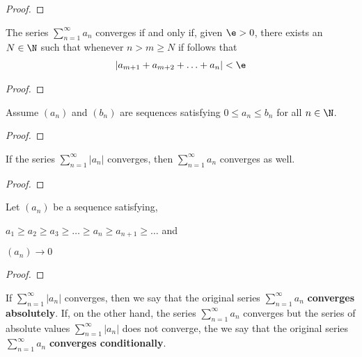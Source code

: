 \begin{proof}
\end{proof}

\begin{theorem}
	The series $\sum_{n=1}^{\infty} a_n$ converges if and only if, given $\e > 0$, there exists an $N \in \N$ such that whenever $n > m \ge N$ if follows that
	\begin{align}
		\left|a_{m+1} + a_{m+2} + \ldots + a_n\right| < \e
	\end{align}
\end{theorem}

\begin{proof}
	
\end{proof}

\begin{theorem}
	Assume $\left( a_n \right) $ and $\left( b_n \right) $ are sequences satisfying $0 \le a_n \le  b_n$ for all $n \in \N$.
\end{theorem}

\begin{proof}
	
\end{proof}

\begin{theorem}
	If the series $\sum_{n=1}^{\infty} \left|a_n\right|$ converges, then $\sum_{n=1}^{\infty} a_n$ converges as well. 
\end{theorem}

\begin{proof}
	
\end{proof}

\begin{theorem}
	Let $\left( a_n \right) $ be a sequence satisfying,
	\begin{romanize}
		\item $a_1 \ge a_2 \ge a_3 \ge  \ldots \ge  a_n \ge  a_{n+1} \ge \ldots$ and
		\item $\left( a_n \right) \to 0$
	\end{romanize}
\end{theorem}

\begin{proof}
	
\end{proof}

\begin{definition}
	If $\sum_{n=1}^{\infty} \left|a_n\right|$ converges, then we say that the original series $\sum_{n=1}^{\infty} a_n$ \textbf{converges absolutely}. If, on the other hand, the series $\sum_{n=1}^{\infty} a_n$ converges but the series of absolute values $\sum_{n=1}^{\infty} \left|a_n\right|$ does not converge, the we say that the original series $\sum_{n=1}^{\infty} a_n$ \textbf{converges conditionally}.
\end{definition}

